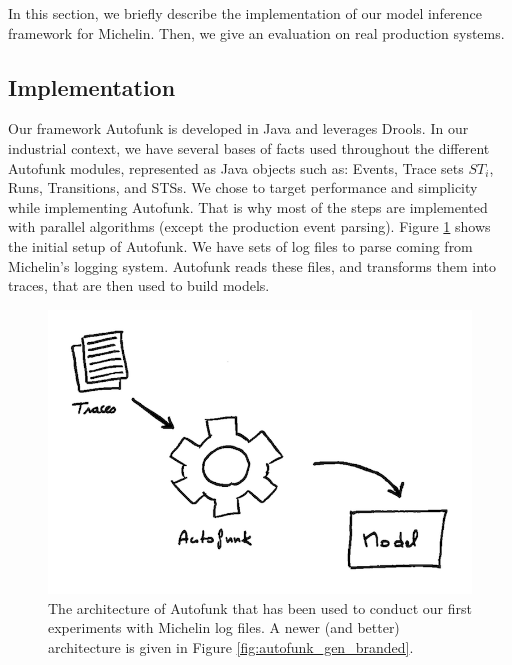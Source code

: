 In this section, we briefly describe the implementation of our
model inference framework for Michelin. Then, we give an
evaluation on real production systems.

\subsection{Implementation}
\label{sec:impl-exp-collect}

Our framework Autofunk is developed in Java and leverages Drools.
In our industrial context, we have several bases of facts used
throughout the different Autofunk modules, represented as Java
objects such as: Events, Trace sets $ST_i$, Runs, Transitions,
and STSs. We chose to target performance and simplicity while
implementing Autofunk. That is why most of the steps are
implemented with parallel algorithms (except the production event
parsing). Figure \ref{fig:autofunk_initial_setup} shows the
initial setup of Autofunk. We have sets of log files to parse
coming from Michelin's logging system. Autofunk reads these
files, and transforms them into traces, that are then used to
build models.

\begin{figure}[ht]
    \includegraphics[width=1.0\linewidth]{figures/autofunk_1.png}

    \caption{The architecture of Autofunk that has been used to
    conduct our first experiments with Michelin log files. A
    newer (and better) architecture is given in Figure
    \ref{fig:autofunk_gen_branded}.}
    \label{fig:autofunk_initial_setup}
\end{figure}

